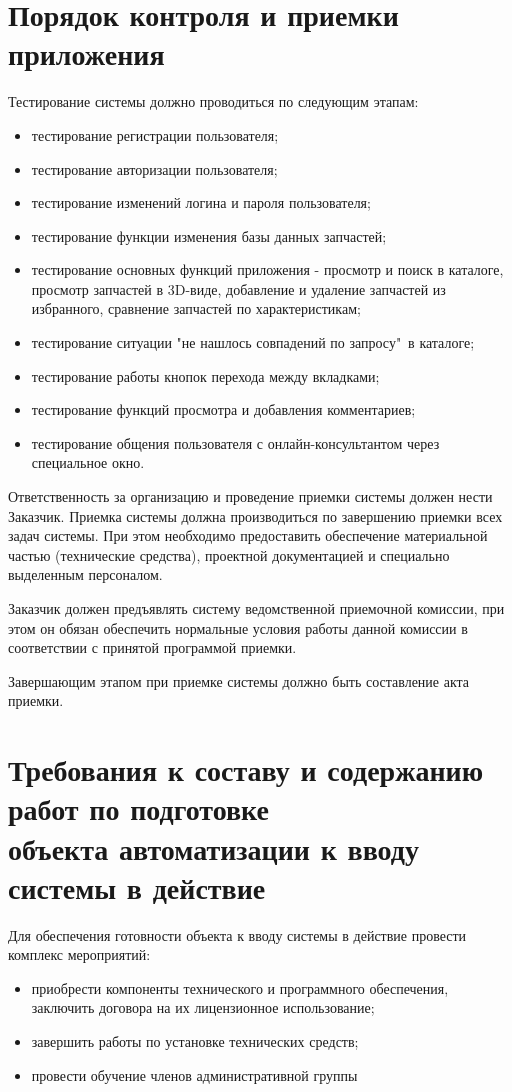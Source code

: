 \documentclass[14pt]{extreport}
\begin{document}
\newpage
\section{Порядок контроля и приемки приложения}

Тестирование системы должно проводиться по следующим этапам:
\begin{itemize}
	\item тестирование регистрации пользователя;
	\item тестирование авторизации пользователя;
	\item тестирование изменений логина и пароля пользователя;
	\item тестирование функции изменения базы данных запчастей;
	\item тестирование основных функций приложения - просмотр и поиск в каталоге, просмотр запчастей в 3D-виде, добавление и удаление запчастей из избранного, сравнение запчастей по характеристикам;
	\item тестирование ситуации "не нашлось совпадений по запросу"\ в каталоге;
	\item тестирование работы кнопок перехода между вкладками;
	\item тестирование функций просмотра и добавления комментариев;
	\item тестирование общения пользователя с онлайн-консультантом через специальное окно.
\end{itemize}

Ответственность за организацию и проведение приемки системы должен нести Заказчик. Приемка системы должна производиться по завершению приемки всех задач системы. При этом необходимо предоставить обеспечение материальной частью (технические средства), проектной документацией и специально выделенным персоналом.

Заказчик должен предъявлять систему ведомственной приемочной комиссии, при этом он обязан обеспечить нормальные условия работы данной комиссии в соответствии с принятой программой приемки.

Завершающим этапом при приемке системы должно быть составление акта приемки.

\newpage
\section{Требования к составу и содержанию работ по подготовке \\
объекта автоматизации к вводу системы в действие}
Для обеспечения готовности объекта к вводу системы в действие провести комплекс мероприятий:
\begin{itemize}
	\item приобрести компоненты технического и программного обеспечения, заключить договора на их лицензионное использование;
	\item завершить работы по установке технических средств;
	\item провести обучение членов административной группы
\end{itemize}
\end{document}
